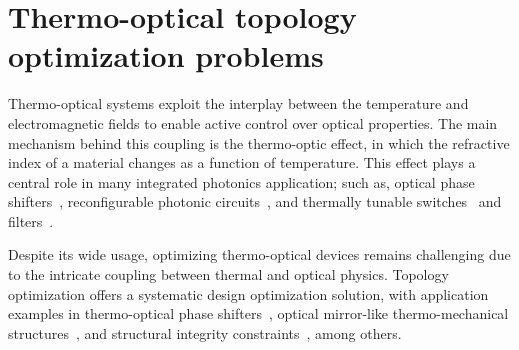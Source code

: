\chapter{Thermo-optical topology optimization problems}
Thermo-optical systems exploit the interplay between the temperature and electromagnetic fields to enable active control over optical properties. 
The main mechanism behind this coupling is the thermo-optic effect, 
in which the refractive index of a material changes as a function of temperature. 
This effect plays a central role in many integrated photonics application; such as,
 optical phase shifters~\cite{TOPS_1, TOPS_2, TOPS_3}, reconfigurable photonic circuits~\cite{program, PIC}, and thermally tunable switches~\cite{switch, switch_2} and filters~\cite{filter}.

 Despite its wide usage, optimizing thermo-optical devices remains challenging due to the intricate coupling 
 between thermal and optical physics. Topology optimization offers a systematic design optimization solution, with application examples in
  thermo-optical phase shifters~\cite{TOPS_heat, ownpub0}, optical mirror-like thermo-mechanical structures~\cite{opt_perf}, and
structural integrity constraints~\cite{structural_heat}, among others.

